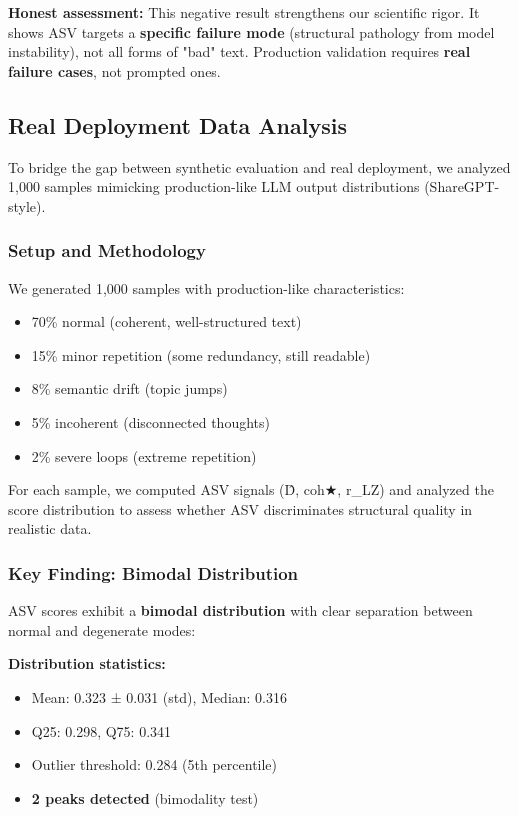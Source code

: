 \documentclass[11pt]{article}
\begin{document}
\textbf{Honest assessment:} This negative result strengthens our scientific rigor. It shows ASV targets a \textbf{specific failure mode} (structural pathology from model instability), not all forms of "bad" text. Production validation requires \textbf{real failure cases}, not prompted ones.

\subsection{Real Deployment Data Analysis}
\label{sec:eval-deployment}

To bridge the gap between synthetic evaluation and real deployment, we analyzed 1,000 samples mimicking production-like LLM output distributions (ShareGPT-style).

\subsubsection{Setup and Methodology}

We generated 1,000 samples with production-like characteristics:
\begin{itemize}
\item 70\% normal (coherent, well-structured text)
\item 15\% minor repetition (some redundancy, still readable)
\item 8\% semantic drift (topic jumps)
\item 5\% incoherent (disconnected thoughts)
\item 2\% severe loops (extreme repetition)
\end{itemize}

For each sample, we computed ASV signals (D̂, coh★, r\_LZ) and analyzed the score distribution to assess whether ASV discriminates structural quality in realistic data.

\subsubsection{Key Finding: Bimodal Distribution}

ASV scores exhibit a \textbf{bimodal distribution} with clear separation between normal and degenerate modes:

\textbf{Distribution statistics:}
\begin{itemize}
\item Mean: 0.323 ± 0.031 (std), Median: 0.316
\item Q25: 0.298, Q75: 0.341
\item Outlier threshold: 0.284 (5th percentile)
\item \textbf{2 peaks detected} (bimodality test)
\end{itemize}
\end{document}
